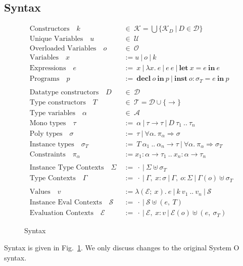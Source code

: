 \documentclass[runningheads]{llncs}
\begin{document}
\subsection{Syntax}
\begin{figure}
  \begin{align*}
    \text{Constructors} \quad k \ &\in \ \mathcal{K} = \bigcup\{\mathcal{K}_D \ | \ D \in \mathcal{D}\} \\
    \text{Unique Variables} \quad u \ &\in \ \mathcal{U}\\
    \text{Overloaded Variables} \quad o \ &\in \ \mathcal{O}\\
    \text{Variables} \quad x\ &:= u  \ | \ o  \ | \ k\\
    \text{Expressions} \quad e \ &:= \ x \ | \ \lambda x. \ e \ | \ e \ e \ | \ \textbf{let} \ x = e \ \textbf{in} \ e \\
    \text{Programs} \quad p \ &:= \ \textbf{decl} \ o \ \textbf{in} \ p \ | \ \textbf{inst} \ o :  \sigma_T  = e \ \textbf{in} \ p \\
    \\
    \text{Datatype constructors} \quad D \ &\in \ \mathcal{D} \\
    \text{Type constructors} \quad T \ &\in \ \mathcal{T} = \mathcal{D} \cup \{\rightarrow\} \\ 
    \text{Type variables} \quad \alpha \ &\in \ \mathcal{A} \\
    \text{Mono types} \quad \tau \ &:=  \ \alpha \ | \ \tau \rightarrow \tau \ | \ D \ \tau_1 \ .. \ \tau_n \\
    \text{Poly types} \quad \sigma \ &:=  \ \tau \ | \ \forall \alpha. \ \pi_\alpha \Rightarrow \sigma \\
    \text{Instance types} \quad \sigma_T \ &:= \ T \ \alpha_1 \ .. \ \alpha_n \rightarrow \tau \ | \ \forall \alpha. \ \pi_\alpha \Rightarrow \sigma_T \\  
    \text{Constraints} \quad \pi_\alpha \ &:= x_1 : \alpha \rightarrow \tau_1 \ .. \ x_n : \alpha \rightarrow \tau_n \\
    \\
    \text{Instance Type Contexts} \quad \Sigma \ &:= \ \cdot \ | \ \Sigma \uplus  \sigma_T \\
    \text{Type Contexts} \quad \Gamma \ &:= \ \cdot \ | \ \Gamma, \ x : \sigma \ | \ \Gamma, \ o : \Sigma \ | \ \Gamma(o) \uplus \sigma_T \\
    \\
    \text{Values} \quad v \ &:=  \lambda (\mathcal{E}; \ x). \ e \ | \ k \ v_1 \ .. \ v_n \ | \ \mathcal{S} \\
    \text{Instance Eval Contexts} \quad \mathcal{S} \ &:= \ \cdot \ | \ \mathcal{S} \uplus  (e ,\ T) \\
    \text{Evaluation Contexts} \quad \mathcal{E} \ &:= \ \cdot \ | \ \mathcal{E}, \ x : v  \ | \ \mathcal{E}(o) \uplus (e, \ \sigma_T)
  \end{align*}
  \caption{Syntax} \label{syntax}
\end{figure}
\noindent Syntax is given in Fig.~\ref{syntax}. We only discuss changes to the original System O syntax. 
\end{document}
